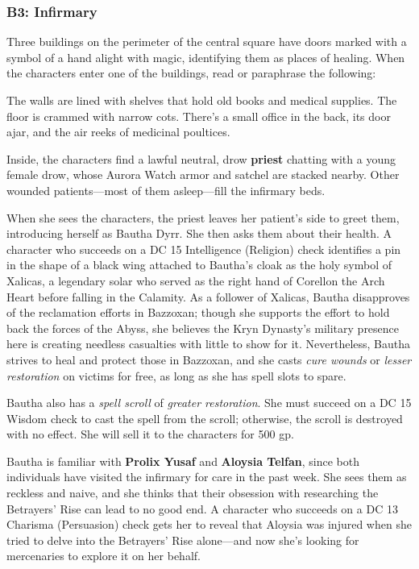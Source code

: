 \documentclass[10pt,a4paper,twoside,bg=print,twocolumn,openany,nodeprecatedcode]{dndbook}
\begin{document}
\subsubsection{B3: Infirmary}
Three buildings on the perimeter of the central square have doors marked with a symbol of a hand alight with magic, identifying them as places of healing. When the characters enter one of the buildings, read or paraphrase the following:

\begin{DndReadAloud}{}
The walls are lined with shelves that hold old books and medical supplies. The floor is crammed with narrow cots. There's a small office in the back, its door ajar, and the air reeks of medicinal poultices.

\end{DndReadAloud}

Inside, the characters find a lawful neutral, drow \textbf{priest} chatting with a young female drow, whose Aurora Watch armor and satchel are stacked nearby. Other wounded patients—most of them asleep—fill the infirmary beds.

When she sees the characters, the priest leaves her patient's side to greet them, introducing herself as Bautha Dyrr. She then asks them about their health. A character who succeeds on a DC 15 Intelligence (Religion) check identifies a pin in the shape of a black wing attached to Bautha's cloak as the holy symbol of Xalicas, a legendary solar who served as the right hand of Corellon the Arch Heart before falling in the Calamity. As a follower of Xalicas, Bautha disapproves of the reclamation efforts in Bazzoxan; though she supports the effort to hold back the forces of the Abyss, she believes the Kryn Dynasty's military presence here is creating needless casualties with little to show for it. Nevertheless, Bautha strives to heal and protect those in Bazzoxan, and she casts \textit{cure wounds} or \textit{lesser restoration} on victims for free, as long as she has spell slots to spare.

Bautha also has a \textit{spell scroll} of \textit{greater restoration}. She must succeed on a DC 15 Wisdom check to cast the spell from the scroll; otherwise, the scroll is destroyed with no effect. She will sell it to the characters for 500 gp.

Bautha is familiar with \textbf{Prolix Yusaf} and \textbf{Aloysia Telfan}, since both individuals have visited the infirmary for care in the past week. She sees them as reckless and naive, and she thinks that their obsession with researching the Betrayers' Rise can lead to no good end. A character who succeeds on a DC 13 Charisma (Persuasion) check gets her to reveal that Aloysia was injured when she tried to delve into the Betrayers' Rise alone—and now she's looking for mercenaries to explore it on her behalf.
\end{document}
